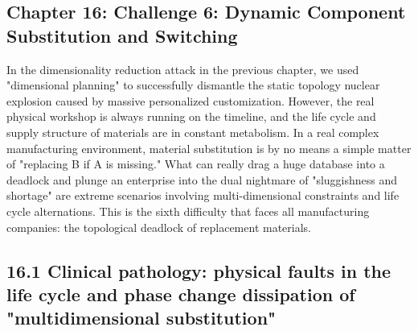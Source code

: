 \documentclass[11pt,a4paper]{article}
\begin{document}
\subsection*{Chapter 16: Challenge 6: Dynamic Component Substitution and Switching}
In the dimensionality reduction attack in the previous chapter, we used "dimensional planning" to successfully dismantle the static topology nuclear explosion caused by massive personalized customization. However, the real physical workshop is always running on the timeline, and the life cycle and supply structure of materials are in constant metabolism. In a real complex manufacturing environment, material substitution is by no means a simple matter of "replacing B if A is missing." What can really drag a huge database into a deadlock and plunge an enterprise into the dual nightmare of "sluggishness and shortage" are extreme scenarios involving multi-dimensional constraints and life cycle alternations. This is the sixth difficulty that faces all manufacturing companies: the topological deadlock of replacement materials.


\subsection*{16.1 Clinical pathology: physical faults in the life cycle and phase change dissipation of "multidimensional substitution"}
\end{document}
